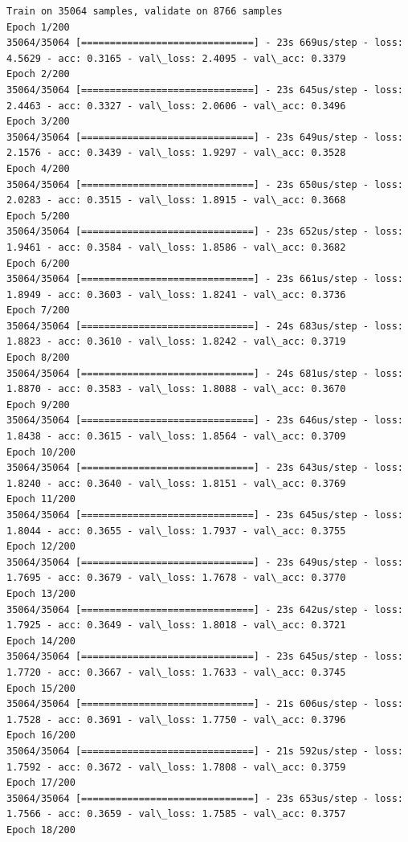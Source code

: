 \documentclass[11pt]{article}
\begin{document}
    \begin{Verbatim}[commandchars=\\\{\}]
Train on 35064 samples, validate on 8766 samples
Epoch 1/200
35064/35064 [==============================] - 23s 669us/step - loss: 4.5629 - acc: 0.3165 - val\_loss: 2.4095 - val\_acc: 0.3379
Epoch 2/200
35064/35064 [==============================] - 23s 645us/step - loss: 2.4463 - acc: 0.3327 - val\_loss: 2.0606 - val\_acc: 0.3496
Epoch 3/200
35064/35064 [==============================] - 23s 649us/step - loss: 2.1576 - acc: 0.3439 - val\_loss: 1.9297 - val\_acc: 0.3528
Epoch 4/200
35064/35064 [==============================] - 23s 650us/step - loss: 2.0283 - acc: 0.3515 - val\_loss: 1.8915 - val\_acc: 0.3668
Epoch 5/200
35064/35064 [==============================] - 23s 652us/step - loss: 1.9461 - acc: 0.3584 - val\_loss: 1.8586 - val\_acc: 0.3682
Epoch 6/200
35064/35064 [==============================] - 23s 661us/step - loss: 1.8949 - acc: 0.3603 - val\_loss: 1.8241 - val\_acc: 0.3736
Epoch 7/200
35064/35064 [==============================] - 24s 683us/step - loss: 1.8823 - acc: 0.3610 - val\_loss: 1.8242 - val\_acc: 0.3719
Epoch 8/200
35064/35064 [==============================] - 24s 681us/step - loss: 1.8870 - acc: 0.3583 - val\_loss: 1.8088 - val\_acc: 0.3670
Epoch 9/200
35064/35064 [==============================] - 23s 646us/step - loss: 1.8438 - acc: 0.3615 - val\_loss: 1.8564 - val\_acc: 0.3709
Epoch 10/200
35064/35064 [==============================] - 23s 643us/step - loss: 1.8240 - acc: 0.3640 - val\_loss: 1.8151 - val\_acc: 0.3769
Epoch 11/200
35064/35064 [==============================] - 23s 645us/step - loss: 1.8044 - acc: 0.3655 - val\_loss: 1.7937 - val\_acc: 0.3755
Epoch 12/200
35064/35064 [==============================] - 23s 649us/step - loss: 1.7695 - acc: 0.3679 - val\_loss: 1.7678 - val\_acc: 0.3770
Epoch 13/200
35064/35064 [==============================] - 23s 642us/step - loss: 1.7925 - acc: 0.3649 - val\_loss: 1.8018 - val\_acc: 0.3721
Epoch 14/200
35064/35064 [==============================] - 23s 645us/step - loss: 1.7720 - acc: 0.3667 - val\_loss: 1.7633 - val\_acc: 0.3745
Epoch 15/200
35064/35064 [==============================] - 21s 606us/step - loss: 1.7528 - acc: 0.3691 - val\_loss: 1.7750 - val\_acc: 0.3796
Epoch 16/200
35064/35064 [==============================] - 21s 592us/step - loss: 1.7592 - acc: 0.3672 - val\_loss: 1.7808 - val\_acc: 0.3759
Epoch 17/200
35064/35064 [==============================] - 23s 653us/step - loss: 1.7566 - acc: 0.3659 - val\_loss: 1.7585 - val\_acc: 0.3757
Epoch 18/200

\end{Verbatim}
\end{document}
